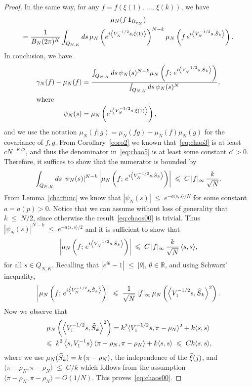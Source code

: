 \documentclass[10pt,a4paper]{article}
\renewcommand{\leq}{\;\leqslant\;}
\newcommand{\scalar}[2]{\langle #1, #2\rangle}
\newcommand{\ind}{\mathbf{1}}
\newcommand{\bbR}{\mathbb{R}}
\let\g=\gamma
\let\r=\rho
\let\O=\Omega
\let\oldhat\hat
\renewcommand*{\hat}[1]{\mathchoice{\widehat{#1}}{\widehat{#1}}{\oldhat{#1}}{\oldhat{#1}}}
\begin{document}
\begin{proof}
In the same way, for any $f=f(\xi(1),\,\dots,\,\xi(k))$, we have
\begin{multline}\label{eq:chao4}
\mu_N(f\,\ind_{\O_{\r_N}})\\
=\frac1{B_N(2\pi)^K}\int_{Q_{N,K}}d s \,\mu_N\left(e^{i\left\langle V_N^{-1/2} s,\hat\xi(1)\right\rangle}\right)^{N-k}\mu_N\left(f \,e^{i\left\langle V_N^{-1/2} s,\hat S_k\right\rangle}\right).
\end{multline}
In conclusion, we have
\begin{align}
\g_N(f)-\mu_N(f) &=\frac{\int_{Q_{N,K}}d s \,\psi_N(s)^{N-k}\mu_N\left(f; \,e^{i\left\langle V_N^{-1/2} s,\hat S_k\right\rangle}\right)}{
\int_{Q_{N,K}}d s \,\psi_N(s)^{N}\,},\label{eq:chao5}
\\
\intertext{where}
\psi_N(s) &=\mu_N\left(e^{i\left\langle V_N^{-1/2} s,\hat\xi(1)\right\rangle}\right),\nonumber
\end{align}
and we use the notation $\mu_N(f; g)=\mu_N(fg)-\mu_N(f)\mu_N(g)$ for the covariance of $f,g$. From Corollary~\ref{coro2} we known that~\eqref{eq:chao3} is at least $cN^{-K/2}$, and thus the denominator in~\eqref{eq:chao5} is at least some constant $c'>0$.
Therefore, it suffices to show that the numerator is bounded by
\begin{align}\label{eq:chao6}
\int_{Q_{N,K}}d s \,|\psi_N(s)|^{N-k}\left|\mu_N\left(f ;\,e^{i\left\langle V_N^{-1/2} s,\hat S_k\right\rangle}\right)\right|\leq C \,|f|_\infty\,\frac{k}{\sqrt N}.
\end{align}
From Lemma~\ref{charfunc} we know that $|\psi_N(s)|\leq e^{-a \scalar{s}{s}/N}$ for some constant $a=a(p)>0$. Notice that we can assume without loss of generality that $k\leq N/2$, since otherwise the result~\eqref{eq:chaos00} is trivial. Thus $|\psi_N(s)|^{N-k} \leq e^{-a \scalar{s}{s}/2}$ and it is sufficient to show that
\begin{align}\label{eq:chao7}
\left|\mu_N\left(f; \,e^{i\left\langle V_N^{-1/2} s,\hat S_k\right\rangle}\right)\right|\leq C \,|f|_\infty\,\frac{k}{\sqrt N}\,\scalar{s}{s},
\end{align}
for all $s\in Q_{N,K}$. Recalling that $|e^{i\theta}-1|\leq |\theta|$, $\theta\in\bbR$, and using Schwarz' inequality,
\begin{align}\label{eq:chao71}
\left|\mu_N\left(f; \,e^{i\left\langle V_N^{-1/2} s,\hat S_k\right\rangle}
\right)\right|
\leq \frac1{\sqrt N} \,|f|_\infty\,
\mu_N\left(\left\langle V_1^{-1/2} s,\hat S_k\right\rangle^2\right).
\end{align}
Now we observe that
\begin{multline}\label{eq:chao72}
\mu_N\left(\left\langle V_1^{-1/2} s,\hat S_k\right\rangle^2\right) = k^2\scalar{V_1^{-1/2} s}{\pi-\r_N}^2 + k \scalar{s}{s}
\\
 \leq k^2\left\langle s,V_1^{-1}s\right\rangle \left\langle\pi-\r_N,\pi-\r_N\right\rangle + k \scalar{s}{s} \leq Ck \scalar{s}{s},
\end{multline}
where we use $\mu_N(\hat S_k)=k\,(\pi-\r_N)$, the independence of the $\hat\xi(j)$, and $\scalar{\pi-\r_N}{\pi-\r_N}\leq C/k$ which follows from the assumption $\scalar{\pi-\r_N}{\pi-\r_N}=O(1/N)$. This proves~\eqref{eq:chaos00}.


\end{proof}
\end{document}
